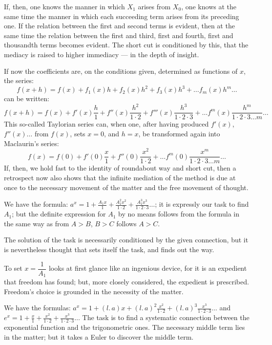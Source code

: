 \documentclass[12pt]{book}
\begin{document}
If, then, one knows the manner in which $X_1$ arises from $X_0$, one knows at the
same time the manner in which each succeeding term arises from its preceding one. If
the relation between the first and second terms is evident, then at the same time the
relation between the first and third, first and fourth, first and thousandth terms
becomes evident. The short cut is conditioned by this, that the mediacy is raised to
higher immediacy --- in the depth of insight.

If now the coefficients are, on the conditions given, determined as functions of $x$,
the series:
\[
f(x+h) = f(x) + f_1(x)h + f_2(x)h^{2} + f_3(x)h^{3} + \dots f_m(x)h^{m}\dots
\]
can be written:
\[
f(x+h) = f(x) + f'(x)\frac{h}{1} + f''(x)\frac{h^{2}}{1\cdot 2}
+ f'''(x)\frac{h^{3}}{1\cdot 2\cdot 3} + \dots
f^{m}(x)\frac{h^{m}}{1\cdot 2\cdot 3\dots m}\dots
\]
This so-called Taylorian series can, when one, after having produced $f'(x)$,
$f''(x)\dots$ from $f(x)$, sets $x = 0$, and $h = x$, be transformed again into
Maclaurin's series:
\[
f(x) = f(0) + f'(0)\frac{x}{1} + f''(0)\frac{x^{2}}{1\cdot 2} + \dots
f^{m}(0)\frac{x^{m}}{1\cdot 2\cdot 3\dots m}\dots
\]
If, then, we hold fast to the identity of roundabout way and short cut, then a
retrospect now also shows that the infinite mediation of the method is due at once to
the necessary movement of the matter and the free movement of thought.

We have the formula: $a^{x} = 1 + \frac{A_1 x}{1} + \frac{A_1^{2}x^{2}}{1\cdot 2}
+ \frac{A_1^{3}x^{3}}{1\cdot 2\cdot 3}\dots$; it is expressly our task to find $A_1$;
but the definite expression for $A_1$ by no means follows from the formula in the
same way as from $A > B$, $B > C$ follows $A > C$.

The solution of the task is necessarily conditioned by the given connection, but it
is nevertheless thought that sets itself the task, and finds out the way.

To set $x = \dfrac{1}{A_1}$ looks at first glance like an ingenious device, for it is
an expedient that freedom has found; but, more closely considered, the expedient is
prescribed. Freedom's choice is grounded in the necessity of the matter.

We have the formulas: $a^{x} = 1 + (l.\,a)x + (l.\,a)^{2}\frac{x^{2}}{1\cdot 2}
+ (l.\,a)^{3}\frac{x^{3}}{1\cdot 2\cdot 3}\dots$ and
$e^{x} = 1 + \frac{x}{1} + \frac{x^{2}}{1\cdot 2} + \frac{x^{3}}{1\cdot 2\cdot 3}
\dots$ The task is to find a systematic connection between the exponential function
and the trigonometric ones. The necessary middle term lies in the matter; but it
takes a Euler to discover the middle term.
\end{document}

